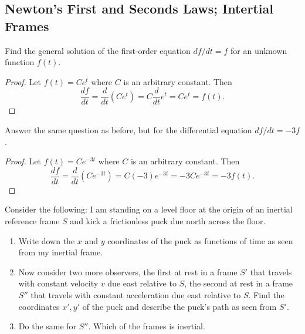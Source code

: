 \subsection{Newton's First and Seconds Laws; Intertial Frames}

\begin{tcolorbox}[title=Problem 24, breakable]
    Find the general solution of the first-order equation $df/dt = f$
    for an unknown function $f(t)$.
\end{tcolorbox}

\begin{proof}
    Let $f(t) = C e^t$ where $C$ is an arbitrary constant.
    Then 
    \[
    \frac{df}{dt} = \frac{d}{dt}(C e^t) = C \frac{d}{dt} e^t = C e^t = f(t).
    \]
\end{proof}

\begin{tcolorbox}[title=Problem 25, breakable]
    Answer the same question as before, but for the differential equation $df/dt = -3 f$.
\end{tcolorbox}

\begin{proof}
    Let $f(t) = C e^{-3t}$ where $C$ is an arbitrary constant. Then 
    \[
        \frac{df}{dt} = \frac{d}{dt}(C e^{-3t}) = C(-3)e^{-3t} = -3Ce^{-3t} = -3f(t).
    \]
\end{proof}

\begin{tcolorbox}[title=Problem 26, breakable]
    Consider the following: I am standing on a level floor 
    at the origin of an inertial reference frame $S$ and kick a frictionless puck 
    due north across the floor. 
    \begin{enumerate}
        \item Write down the $x$ and $y$ coordinates of the puck as functions of time as seen from my inertial 
        frame.
        \item Now consider two more observers, the first at rest in a frame $S'$ that travels with constant velocity 
        $v$ due east relative to $S$, the second at rest in a frame $S''$ that travels with constant acceleration due east relative to $S$.
        Find the coordinates $x', y'$ of the puck and describe the puck's path as seen from $S'$.
        \item Do the same for $S''$. Which of the frames is inertial.
    \end{enumerate}
\end{tcolorbox}

